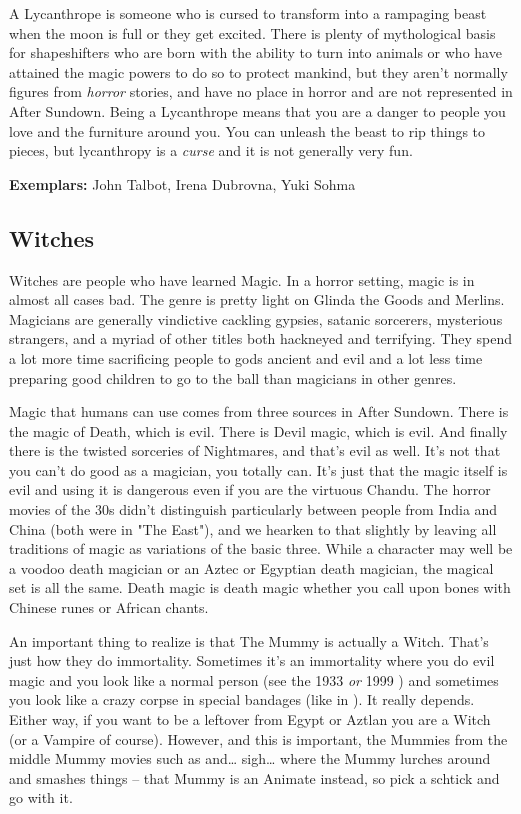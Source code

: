 A Lycanthrope is someone who is cursed to transform into a rampaging beast when the moon is full or they get excited. There is plenty of mythological basis for shapeshifters who are born with the ability to turn into animals or who have attained the magic powers to do so to protect mankind, but they aren't normally figures from \textit{horror} stories, and have no place in horror and are not represented in After Sundown. Being a Lycanthrope means that you are a danger to people you love and the furniture around you. You can unleash the beast to rip things to pieces, but lycanthropy is a \textit{curse} and it is not generally very fun.

\textbf{Exemplars:} John Talbot, Irena Dubrovna, Yuki Sohma

\subsection{Witches} 

Witches are people who have learned Magic. In a horror setting, magic is in almost all cases bad. The genre is pretty light on Glinda the Goods and Merlins. Magicians are generally vindictive cackling gypsies, satanic sorcerers, mysterious strangers, and a myriad of other titles both hackneyed and terrifying. They spend a lot more time sacrificing people to gods ancient and evil and a lot less time preparing good children to go to the ball than magicians in other genres.

Magic that humans can use comes from three sources in After Sundown. There is the magic of Death, which is evil. There is Devil magic, which is evil. And finally there is the twisted sorceries of Nightmares, and that's evil as well. It's not that you can't do good as a magician, you totally can. It's just that the magic itself is evil and using it is dangerous even if you are the virtuous Chandu. The horror movies of the 30s didn't distinguish particularly between people from India and China (both were in "The East"), and we hearken to that slightly by leaving all traditions of magic as variations of the basic three. While a character may well be a voodoo death magician or an Aztec or Egyptian death magician, the magical set is all the same. Death magic is death magic whether you call upon bones with Chinese runes or African chants.

An important thing to realize is that The Mummy is actually a Witch.  That's just how they do immortality. Sometimes it's an immortality where you do evil magic and you look like a normal person (see the 1933 \textit{or} 1999 ) and sometimes you look like a crazy corpse in special bandages (like in ). It really depends. Either way, if you want to be a leftover from Egypt or Aztlan you are a Witch (or a Vampire of course). However, and this is important, the Mummies from the middle Mummy movies such as  and\ldots{} sigh\ldots{}  where the Mummy lurches around and smashes things -- that Mummy is an Animate instead, so pick a schtick and go with it.

